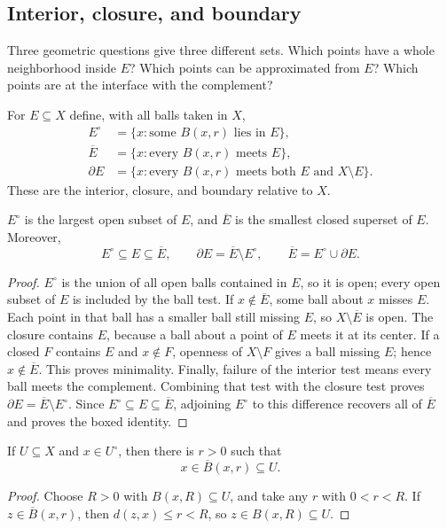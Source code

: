 \subsection{Interior, closure, and boundary}
Three geometric questions give three different sets. Which points have a
whole neighborhood inside $E$? Which points can be approximated from $E$?
Which points are at the interface with the complement?
\begin{definition}
For $E\subseteq X$ define, with all balls taken in $X$,
\begin{align*}
E^\circ&=\{x:\text{some }B(x,r)\text{ lies in }E\},\\
\overline E&=\{x:\text{every }B(x,r)\text{ meets }E\},\\
\partial E&=\{x:\text{every }B(x,r)\text{ meets both }E\text{ and }X\setminus E\}.
\end{align*}
These are the interior, closure, and boundary relative to $X$.
\end{definition}
\begin{proposition}
\label{prop:closure-characterizations}
$E^\circ$ is the largest open subset of $E$, and $\overline E$ is the
smallest closed superset of $E$. Moreover,
\[
E^\circ\subseteq E\subseteq\overline E,
\qquad
\partial E=\overline E\setminus E^\circ,
\qquad
\boxed{\overline E=E^\circ\cup\partial E}.
\]
\end{proposition}
\begin{proof}
$E^\circ$ is the union of all open balls contained in $E$, so it is open;
every open subset of $E$ is included by the ball test. If $x\notin\overline E$,
some ball about $x$ misses $E$. Each point in that ball has a smaller ball
still missing $E$, so $X\setminus\overline E$ is open. The closure contains
$E$, because a ball about a point of $E$ meets it at its center. If a closed
$F$ contains $E$ and $x\notin F$, openness of $X\setminus F$ gives a ball
missing $E$; hence $x\notin\overline E$. This proves minimality.
Finally, failure of the interior test means every ball meets the complement.
Combining that test with the closure test proves
$\partial E=\overline E\setminus E^\circ$. Since
$E^\circ\subseteq E\subseteq\overline E$, adjoining $E^\circ$ to this
difference recovers all of $\overline E$ and proves the boxed identity.
\end{proof}
\begin{proposition}
\label{prop:interior-closed-ball}
If $U\subseteq X$ and $x\in U^\circ$, then there is $r>0$ such that
\[
x\in\overline B(x,r)\subseteq U.
\]
\end{proposition}
\begin{proof}
Choose $R>0$ with $B(x,R)\subseteq U$, and take any $r$ with
$0<r<R$. If $z\in\overline B(x,r)$, then
$d(z,x)\leq r<R$, so $z\in B(x,R)\subseteq U$.
\end{proof}

